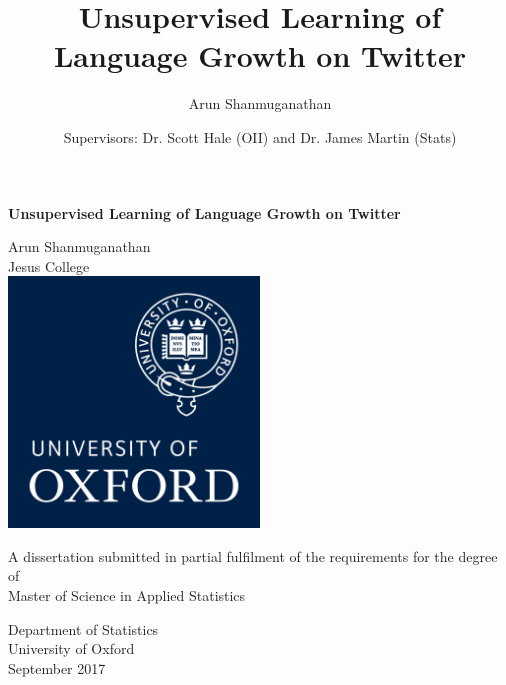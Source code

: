 \documentclass[12pt]{article}
\title{Unsupervised Learning of Language Growth on Twitter}
\author{Arun Shanmuganathan}
\date{Supervisors: Dr. Scott Hale (OII) and Dr. James Martin (Stats)}
\begin{document}
\begin{titlepage}
    \begin{center}
        \vspace*{0.5cm}

        \Huge
        \textbf{Unsupervised Learning of Language Growth on Twitter}
        \vspace{0.5cm}

\LARGE Arun Shanmuganathan\\
        Jesus College\\

        \vspace{1.2cm}
        \includegraphics[width=0.5\textwidth]{images/logo.png}
        \vspace{0.8cm}

\normalsize A dissertation submitted in partial fulfilment of the requirements for the degree of \\ Master of Science in Applied Statistics\\



        \vspace{0.8cm}



        \large
        Department of Statistics\\
        University of Oxford\\
        September 2017
    \end{center}
\end{titlepage}


\end{document}

